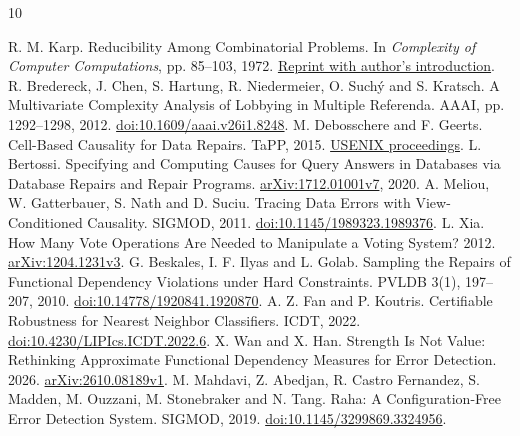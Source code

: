 \documentclass[11pt]{article}
\begin{document}
\begin{thebibliography}{10}
\raggedright
{} R. M. Karp. Reducibility Among Combinatorial Problems.
In \emph{Complexity of Computer Computations}, pp. 85--103, 1972.
\href{https://www.cs.umd.edu/~gasarch/BLOGPAPERS/Karp.pdf}{Reprint with author's introduction}.
 R. Bredereck, J. Chen, S. Hartung, R. Niedermeier,
O. Such\'{y} and S. Kratsch. A Multivariate Complexity Analysis of Lobbying in
Multiple Referenda. AAAI, pp. 1292--1298, 2012.
\href{https://doi.org/10.1609/aaai.v26i1.8248}{doi:10.1609/aaai.v26i1.8248}.
 M. Debosschere and F. Geerts.
Cell-Based Causality for Data Repairs. TaPP, 2015.
\href{https://www.usenix.org/conference/tapp15/workshop-program/presentation/debosschere}{USENIX proceedings}.
 L. Bertossi. Specifying and Computing Causes for Query
Answers in Databases via Database Repairs and Repair Programs.
\href{https://arxiv.org/abs/1712.01001v7}{arXiv:1712.01001v7}, 2020.
 A. Meliou, W. Gatterbauer, S. Nath and D. Suciu.
Tracing Data Errors with View-Conditioned Causality. SIGMOD, 2011.
\href{https://doi.org/10.1145/1989323.1989376}{doi:10.1145/1989323.1989376}.
 L. Xia. How Many Vote Operations Are Needed to Manipulate a
Voting System? 2012. \href{https://arxiv.org/abs/1204.1231v3}{arXiv:1204.1231v3}.
 G. Beskales, I. F. Ilyas and L. Golab. Sampling the Repairs
of Functional Dependency Violations under Hard Constraints. PVLDB 3(1),
197--207, 2010. \href{https://doi.org/10.14778/1920841.1920870}{doi:10.14778/1920841.1920870}.
 A. Z. Fan and P. Koutris. Certifiable Robustness for Nearest
Neighbor Classifiers. ICDT, 2022.
\href{https://doi.org/10.4230/LIPIcs.ICDT.2022.6}{doi:10.4230/LIPIcs.ICDT.2022.6}.
 X. Wan and X. Han. Strength Is Not Value: Rethinking Approximate
Functional Dependency Measures for Error Detection. 2026.
\href{https://arxiv.org/abs/2610.08189v1}{arXiv:2610.08189v1}.
 M. Mahdavi, Z. Abedjan, R. Castro Fernandez, S. Madden,
M. Ouzzani, M. Stonebraker and N. Tang. Raha: A Configuration-Free Error
Detection System. SIGMOD, 2019.
\href{https://doi.org/10.1145/3299869.3324956}{doi:10.1145/3299869.3324956}.
\end{thebibliography}
\end{document}
